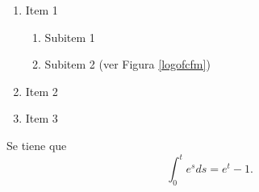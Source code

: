 \begin{intro}
\lipsum[5]
\begin{enumerate}
	\item Item 1
	\begin{enumerate}
		\item Subitem 1
		\item Subitem 2 (ver Figura \ref{logofcfm})
	\end{enumerate}
	\item Item 2
	\item Item 3
\end{enumerate}
\begin{teo}
Se tiene que $$\int_0^t e^sds=e^t-1.$$
\end{teo}
\lipsum[5]
\end{intro}